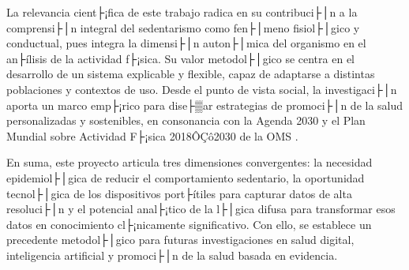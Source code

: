 La relevancia cient├¡fica de este trabajo radica en su contribuci├│n a la comprensi├│n integral del sedentarismo como fen├│meno fisiol├│gico y conductual, pues integra la dimensi├│n auton├│mica del organismo en el an├ílisis de la actividad f├¡sica. Su valor metodol├│gico se centra en el desarrollo de un sistema explicable y flexible, capaz de adaptarse a distintas poblaciones y contextos de uso. Desde el punto de vista social, la investigaci├│n aporta un marco emp├¡rico para dise├▒ar estrategias de promoci├│n de la salud personalizadas y sostenibles, en consonancia con la Agenda 2030 y el Plan Mundial sobre Actividad F├¡sica 2018ÔÇô2030 de la OMS \cite{WHO2018}.

En suma, este proyecto articula tres dimensiones convergentes: la necesidad epidemiol├│gica de reducir el comportamiento sedentario, la oportunidad tecnol├│gica de los dispositivos port├ítiles para capturar datos de alta resoluci├│n y el potencial anal├¡tico de la l├│gica difusa para transformar esos datos en conocimiento cl├¡nicamente significativo. Con ello, se establece un precedente metodol├│gico para futuras investigaciones en salud digital, inteligencia artificial y promoci├│n de la salud basada en evidencia.


